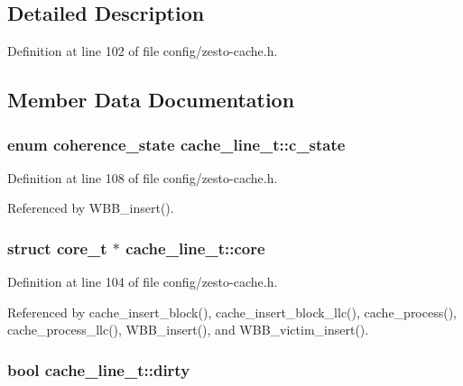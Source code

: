 \subsection{Detailed Description}


Definition at line 102 of file config/zesto-cache.h.

\subsection{Member Data Documentation}
\subsubsection[{c\_\-state}]{\setlength{\rightskip}{0pt plus 5cm}enum {\bf coherence\_\-state} {\bf cache\_\-line\_\-t::c\_\-state}}\label{structcache__line__t_a4f419171c04cf9d51f8775a599d6472}




Definition at line 108 of file config/zesto-cache.h.

Referenced by WBB\_\-insert().
\subsubsection[{core}]{\setlength{\rightskip}{0pt plus 5cm}struct {\bf core\_\-t} $\ast$ {\bf cache\_\-line\_\-t::core}\hspace{0.3cm}{\tt  [read]}}\label{structcache__line__t_a652a8dac89b73d4640b27631109f387}




Definition at line 104 of file config/zesto-cache.h.

Referenced by cache\_\-insert\_\-block(), cache\_\-insert\_\-block\_\-llc(), cache\_\-process(), cache\_\-process\_\-llc(), WBB\_\-insert(), and WBB\_\-victim\_\-insert().
\subsubsection[{dirty}]{\setlength{\rightskip}{0pt plus 5cm}bool {\bf cache\_\-line\_\-t::dirty}}\label{structcache__line__t_b4349edfc16860c559fbf5870b2dfc3f}




